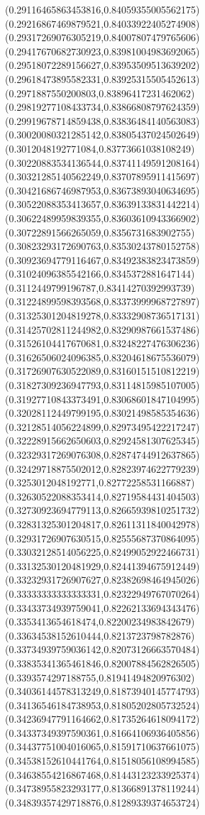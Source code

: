 \documentclass[12pt]{article}
\theoremstyle{plain}
\theoremstyle{definition}
\theoremstyle{remark}
\begin{document}
\begin{figure}
{  (0.29116465863453816,0.84059355005562175)%
  (0.29216867469879521,0.84033922405274908)%
  (0.29317269076305219,0.84007807479765606)%
  (0.29417670682730923,0.83981004983692065)%
  (0.29518072289156627,0.83953509513639202)%
  (0.29618473895582331,0.83925315505452613)%
  (0.2971887550200803,0.83896417231462062)%
  (0.29819277108433734,0.83866808797624359)%
  (0.29919678714859438,0.83836484140563083)%
  (0.30020080321285142,0.83805437024502649)%
  (0.3012048192771084,0.83773661038108249)%
  (0.30220883534136544,0.83741149591208164)%
  (0.30321285140562249,0.83707895911415697)%
  (0.30421686746987953,0.83673893040634695)%
  (0.30522088353413657,0.83639133831442214)%
  (0.30622489959839355,0.83603610943366902)%
  (0.30722891566265059,0.8356731683902755)%
  (0.30823293172690763,0.83530243780152758)%
  (0.30923694779116467,0.83492383823473859)%
  (0.31024096385542166,0.8345372881647144)%
  (0.3112449799196787,0.83414270392993739)%
  (0.31224899598393568,0.83373999968727897)%
  (0.31325301204819278,0.83332908736517131)%
  (0.31425702811244982,0.83290987661537486)%
  (0.31526104417670681,0.83248227476306236)%
  (0.31626506024096385,0.83204618675536079)%
  (0.31726907630522089,0.83160151510812219)%
  (0.31827309236947793,0.83114815985107005)%
  (0.31927710843373491,0.83068601847104995)%
  (0.32028112449799195,0.83021498585354636)%
  (0.32128514056224899,0.82973495422217247)%
  (0.32228915662650603,0.82924581307625345)%
  (0.32329317269076308,0.82874744912637865)%
  (0.32429718875502012,0.82823974622779239)%
  (0.3253012048192771,0.82772258531166887)%
  (0.32630522088353414,0.82719584431404503)%
  (0.32730923694779113,0.82665939810251732)%
  (0.32831325301204817,0.82611311840042978)%
  (0.32931726907630515,0.82555687370864095)%
  (0.33032128514056225,0.82499052922466731)%
  (0.33132530120481929,0.82441394675912449)%
  (0.33232931726907627,0.82382698464945026)%
  (0.33333333333333331,0.82322949767070264)%
  (0.33433734939759041,0.82262133694343476)%
  (0.3353413654618474,0.82200234983842679)%
  (0.33634538152610444,0.8213723798782876)%
  (0.33734939759036142,0.82073126663570484)%
  (0.33835341365461846,0.82007884562826505)%
  (0.3393574297188755,0.81941494820976302)%
  (0.34036144578313249,0.81873940145774793)%
  (0.34136546184738953,0.81805202805732524)%
  (0.34236947791164662,0.81735264618094172)%
  (0.34337349397590361,0.81664106936405856)%
  (0.34437751004016065,0.81591710637661075)%
  (0.34538152610441764,0.81518056108994585)%
  (0.34638554216867468,0.81443123233925374)%
  (0.34738955823293177,0.81366891378119244)%
  (0.34839357429718876,0.81289339374653724)%
}
\end{figure}
\end{document}
